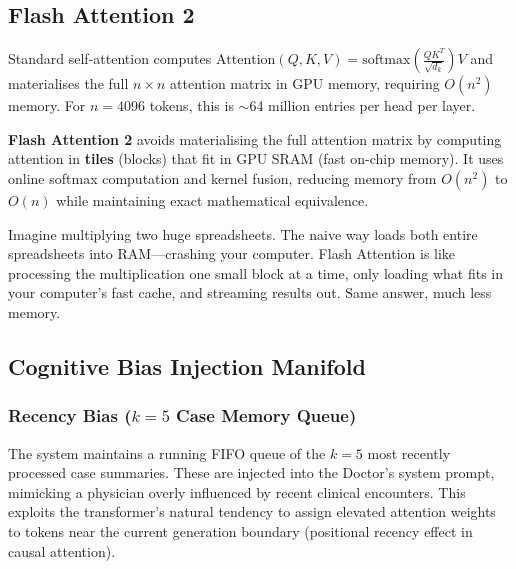 \subsection{Flash Attention 2}

\begin{acadbox}[\textcolor{white}{Academic Definition}]
Standard self-attention computes $\text{Attention}(Q, K, V) = \text{softmax}\left(\frac{QK^T}{\sqrt{d_k}}\right)V$ and materialises the full $n \times n$ attention matrix in GPU memory, requiring $O(n^2)$ memory. For $n = 4096$ tokens, this is $\sim$64 million entries per head per layer.

\textbf{Flash Attention 2} avoids materialising the full attention matrix by computing attention in \textbf{tiles} (blocks) that fit in GPU SRAM (fast on-chip memory). It uses online softmax computation and kernel fusion, reducing memory from $O(n^2)$ to $O(n)$ while maintaining exact mathematical equivalence.
\end{acadbox}

\begin{analogybox}[\textcolor{white}{Simple Analogy}]
Imagine multiplying two huge spreadsheets. The naive way loads both entire spreadsheets into RAM---crashing your computer. Flash Attention is like processing the multiplication one small block at a time, only loading what fits in your computer's fast cache, and streaming results out. Same answer, much less memory.
\end{analogybox}

\subsection{Cognitive Bias Injection Manifold}

\subsubsection{Recency Bias ($k = 5$ Case Memory Queue)}
\begin{acadbox}[\textcolor{white}{Academic Definition}]
The system maintains a running FIFO queue of the $k = 5$ most recently processed case summaries. These are injected into the Doctor's system prompt, mimicking a physician overly influenced by recent clinical encounters. This exploits the transformer's natural tendency to assign elevated attention weights to tokens near the current generation boundary (positional recency effect in causal attention).
\end{acadbox}

